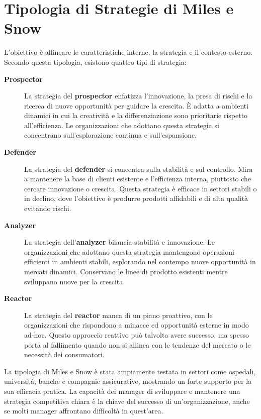 \documentclass{article}
\begin{document}
\section{Tipologia di Strategie di Miles e Snow}
L’obiettivo è allineare le caratteristiche interne, la strategia e il contesto esterno. Secondo questa tipologia, esistono quattro tipi di strategia: 
\begin{description}
    \item[\textbf{Prospector}] La strategia del \textbf{prospector} enfatizza l'innovazione, la presa di rischi e la ricerca di nuove opportunità per guidare la crescita. È adatta a ambienti dinamici in cui la creatività e la differenziazione sono prioritarie rispetto all’efficienza. Le organizzazioni che adottano questa strategia si concentrano sull’esplorazione continua e sull’espansione.
    
    \item[\textbf{Defender}] La strategia del \textbf{defender} si concentra sulla stabilità e sul controllo. Mira a mantenere la base di clienti esistente e l’efficienza interna, piuttosto che cercare innovazione o crescita. Questa strategia è efficace in settori stabili o in declino, dove l’obiettivo è produrre prodotti affidabili e di alta qualità evitando rischi.
    
    \item[\textbf{Analyzer}] La strategia dell’\textbf{analyzer} bilancia stabilità e innovazione. Le organizzazioni che adottano questa strategia mantengono operazioni efficienti in ambienti stabili, esplorando nel contempo nuove opportunità in mercati dinamici. Conservano le linee di prodotto esistenti mentre sviluppano nuove per la crescita.
    
    \item[\textbf{Reactor}] La strategia del \textbf{reactor} manca di un piano proattivo, con le organizzazioni che rispondono a minacce ed opportunità esterne in modo ad-hoc. Questo approccio reattivo può talvolta avere successo, ma spesso porta al fallimento quando non si allinea con le tendenze del mercato o le necessità dei consumatori.
\end{description}

La tipologia di Miles e Snow è stata ampiamente testata in settori come ospedali, università, banche e compagnie assicurative, mostrando un forte supporto per la sua efficacia pratica. La capacità dei manager di sviluppare e mantenere una strategia competitiva chiara è la chiave del successo di un’organizzazione, anche se molti manager affrontano difficoltà in quest’area.
\end{document}
